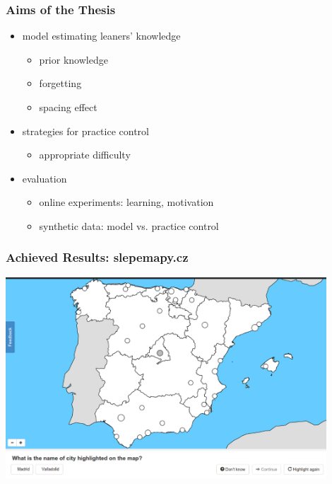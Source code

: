 \documentclass[xcolor=svgnames]{beamer}
\begin{document}
\begin{frame}
	\frametitle{Aims of the Thesis}
	\begin{itemize}
		\item model estimating leaners' knowledge
			\begin{itemize}
				\item prior knowledge
				\item forgetting
				\item spacing effect
			\end{itemize}
		\item strategies for practice control
			\begin{itemize}
				\item appropriate difficulty
			\end{itemize}
		\item evaluation
			\begin{itemize}
				\item online experiments: learning, motivation
				\item synthetic data: model vs. practice control
			\end{itemize}
	\end{itemize}
\end{frame}
\begin{frame}
	\frametitle{Achieved Results: slepemapy.cz}
	\begin{center}
		\includegraphics[width=0.9\textwidth]{figure/slepemapy_spain_highlighted.png}
	\end{center}
\end{frame}
\end{document}

